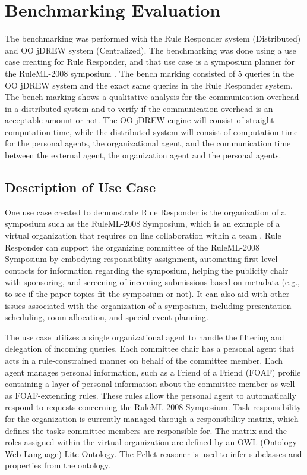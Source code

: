 \documentclass[12pt]{report}
\begin{document}
\chapter{Benchmarking Evaluation}
The benchmarking was performed with the Rule Responder system (Distributed) and OO jDREW system (Centralized).  The benchmarking was done using a use case creating for Rule Responder, and that use case is a symposium planner for the RuleML-2008 symposium \cite{RuleML2008}.  The bench marking consisted of 5 queries in the OO jDREW system and the exact same queries in the Rule Responder system.  The bench marking shows a qualitative analysis for the communication overhead in a distributed system and to verify if the communication overhead is an acceptable amount or not.  The OO jDREW engine will consist of straight computation time, while the distributed system will consist of computation time for the personal agents, the organizational agent, and the communication time between the external agent, the organization agent and the personal agents.

\section{Description of Use Case}
One use case created to demonstrate Rule Responder is the organization of a symposium such as the RuleML-2008 Symposium, which is an example of a virtual organization that requires on line collaboration within a team \cite{CraigBoley08}.  Rule Responder can support the organizing committee of the RuleML-2008 Symposium by embodying responsibility assignment, automating first-level contacts for information regarding the symposium, helping the publicity chair with sponsoring, and screening of incoming submissions based on metadata (e.g., to see if the paper topics fit the symposium or not).  It can also aid with other issues associated with the organization of a symposium, including presentation scheduling, room allocation, and special event planning.

The use case utilizes a single organizational agent to handle the filtering and delegation of incoming queries.  Each committee chair has a personal agent that acts in a rule-constrained manner on behalf of the committee member. Each agent manages personal information, such as a Friend of a Friend (FOAF) profile containing a layer of personal information about the committee member as well as FOAF-extending rules.  These rules allow the personal agent to automatically respond to requests concerning the RuleML-2008 Symposium.  Task responsibility for the organization is currently managed through a responsibility matrix, which defines the tasks committee members are responsible for.  The matrix and the roles assigned within the virtual organization are defined by an OWL (Ontology Web Language) Lite Ontology.  The Pellet \cite{Pellet} reasoner is used to infer subclasses and properties from the ontology.
\end{document}
